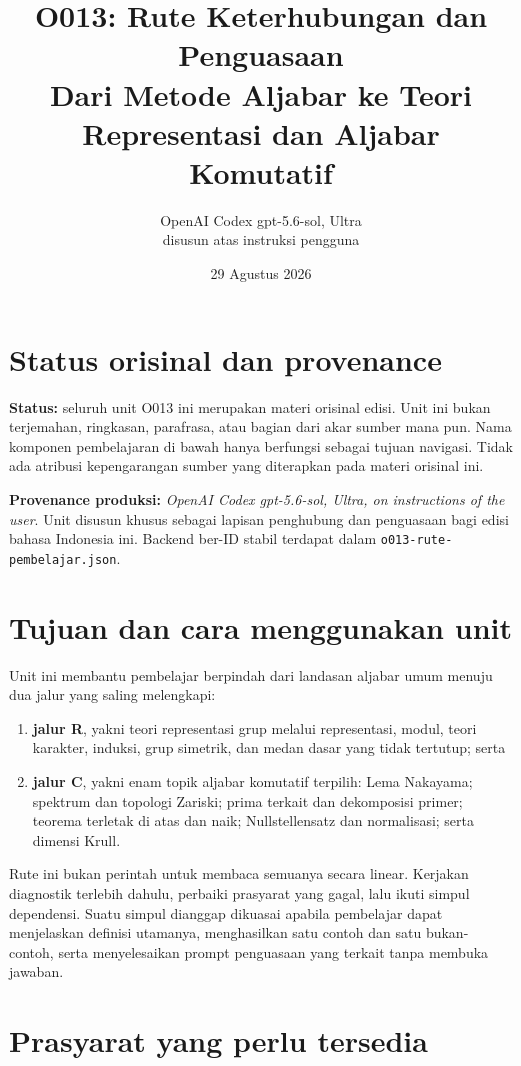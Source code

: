 \documentclass[11pt,a4paper]{article}
\title{O013: Rute Keterhubungan dan Penguasaan\\
\large Dari Metode Aljabar ke Teori Representasi dan Aljabar Komutatif}
\author{OpenAI Codex gpt-5.6-sol, Ultra\\\small disusun atas instruksi pengguna}
\date{29 Agustus 2026}
\newcommand{\jalur}[1]{\textbf{#1}}
\begin{document}
\maketitle

\section*{Status orisinal dan provenance}

\textbf{Status:} seluruh unit O013 ini merupakan materi orisinal edisi.
Unit ini bukan terjemahan, ringkasan, parafrasa, atau bagian dari akar sumber
mana pun. Nama komponen pembelajaran di bawah hanya berfungsi sebagai tujuan
navigasi. Tidak ada atribusi kepengarangan sumber yang diterapkan pada materi
orisinal ini.

\textbf{Provenance produksi:} \emph{OpenAI Codex gpt-5.6-sol, Ultra, on instructions of the user}.
Unit disusun khusus sebagai lapisan penghubung dan
penguasaan bagi edisi bahasa Indonesia ini. Backend ber-ID stabil terdapat
dalam \texttt{o013-rute-pembelajar.json}.

\section{Tujuan dan cara menggunakan unit}

Unit ini membantu pembelajar berpindah dari landasan aljabar umum menuju dua
jalur yang saling melengkapi:

\begin{enumerate}
\item \jalur{jalur R}, yakni teori representasi grup melalui representasi,
modul, teori karakter, induksi, grup simetrik, dan medan dasar yang tidak
tertutup; serta
\item \jalur{jalur C}, yakni enam topik aljabar komutatif terpilih: Lema
Nakayama; spektrum dan topologi Zariski; prima terkait dan dekomposisi primer;
teorema terletak di atas dan naik; Nullstellensatz dan normalisasi; serta
dimensi Krull.
\end{enumerate}

Rute ini bukan perintah untuk membaca semuanya secara linear. Kerjakan
diagnostik terlebih dahulu, perbaiki prasyarat yang gagal, lalu ikuti simpul
dependensi. Suatu simpul dianggap dikuasai apabila pembelajar dapat menjelaskan
definisi utamanya, menghasilkan satu contoh dan satu bukan-contoh, serta
menyelesaikan prompt penguasaan yang terkait tanpa membuka jawaban.

\section{Prasyarat yang perlu tersedia}
\end{document}
